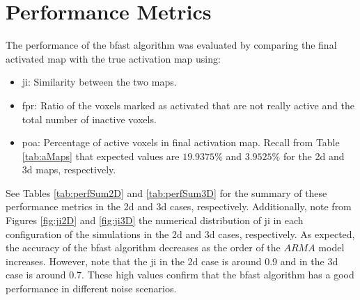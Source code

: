 \newpage

\section{Performance Metrics}

The performance of the \gls{bfast} algorithm was evaluated by comparing the final activated map with the true activation map using:

\begin{itemize}
\item \gls{ji}: Similarity between the two maps.
\item \gls{fpr}: Ratio of the voxels marked as activated that are not really active and the 
total number of inactive voxels.
\item \gls{poa}: Percentage of active voxels in final activation map. Recall from Table \ref{tab:aMaps} 
that expected values are $19.9375 \%$ and $3.9525 \%$ for the \gls{2d} and \gls{3d} maps, respectively.
\end{itemize}

See Tables \ref{tab:perfSum2D} and \ref{tab:perfSum3D} for the summary of these performance 
metrics in the \gls{2d} and \gls{3d} cases, respectively. Additionally, note from 
Figures \ref{fig:ji2D} and \ref{fig:ji3D} the numerical distribution of
\gls{ji} in each configuration of the simulations in the \gls{2d} and \gls{3d}
cases, respectively. As expected, the accuracy of the \gls{bfast} algorithm decreases 
as the order of the $ARMA$ model increases. However, note that the \gls{ji} in the \gls{2d} case
is around 0.9 and in the \gls{3d} case is around 0.7. These high values confirm that the \gls{bfast}
algorithm has a good performance in different noise scenarios.

